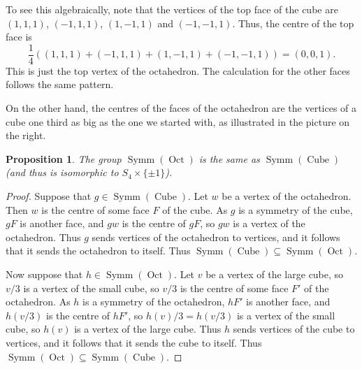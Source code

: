 \documentclass{amsart}
\DeclareMathOperator{\Cube}     {Cube}
\DeclareMathOperator{\Oct}      {Oct}
\DeclareMathOperator{\Symm}     {Symm}
\newcommand{\tm}        {\times}
\newcommand{\sse}       {\subseteq}
\newcommand{\blob}      {circle(0.03cm)}
\renewcommand{\:}{\colon}
\newtheorem{proposition}[theorem]{Proposition}
\theoremstyle{definition}
\begin{document}
\begin{center}
\end{center}
To see this algebraically, note that the vertices of the top face of
the cube are $(1,1,1)$, $(-1,1,1)$, $(1,-1,1)$ and $(-1,-1,1)$.  Thus,
the centre of the top face is
\[ \frac{1}{4}((1,1,1)+(-1,1,1)+(1,-1,1)+(-1,-1,1))=(0,0,1). \]
This is just the top vertex of the octahedron.  The calculation for
the other faces follows the same pattern.

On the other hand, the centres of the faces of the octahedron are the
vertices of a cube one third as big as the one we started with, as
illustrated in the picture on the right.

\begin{proposition}
 The group $\Symm(\Oct)$ is the same as $\Symm(\Cube)$ (and thus is
 isomorphic to $S_4\tm\{\pm 1\}$).
\end{proposition}
\begin{proof}
 Suppose that $g\in\Symm(\Cube)$.  Let $w$ be a vertex of the
 octahedron.  Then $w$ is the centre of some face $F$ of the cube.  As
 $g$ is a symmetry of the cube, $gF$ is another face, and $gw$ is the
 centre of $gF$, so $gw$ is a vertex of the octahedron.  Thus $g$
 sends vertices of the octahedron to vertices, and it follows that it
 sends the octahedron to itself.  Thus $\Symm(\Cube)\sse\Symm(\Oct)$.

 Now suppose that $h\in\Symm(\Oct)$.  Let $v$ be a vertex of the large
 cube, so $v/3$ is a vertex of the small cube, so $v/3$ is the centre
 of some face $F'$ of the octahedron.  As $h$ is a symmetry of the
 octahedron, $hF'$ is another face, and $h(v/3)$ is the centre of
 $hF'$, so $h(v)/3=h(v/3)$ is a vertex of the small cube, so $h(v)$ is
 a vertex of the large cube.  Thus $h$ sends vertices of the cube to
 vertices, and it follows that it sends the cube to itself.
 Thus $\Symm(\Oct)\sse\Symm(\Cube)$.
\end{proof}
\end{document}
